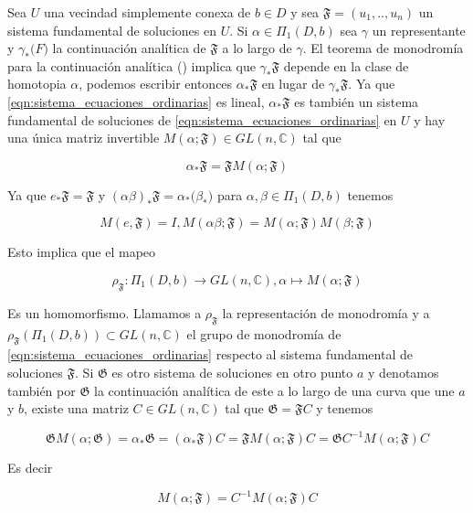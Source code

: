 Sea $U$ una vecindad simplemente conexa de $b \in D $ y sea $\mathfrak{F}= (u_{1},..,u_{n})$ un sistema fundamental de soluciones en $U$. Si $\alpha \in \Pi_{1}(D,b)$ sea $\gamma$ un representante y $\gamma_{*} \mathfrak(F)$ la continuaci\'on anal\'itica de $\mathfrak{F} $ a lo largo de $\gamma$. El teorema de monodrom\'ia para la continuaci\'on anal\'itica (\cite{gausspainleve}) implica que $\gamma_{*} \mathfrak{F}$ depende en la clase de homotopia $\alpha$, podemos escribir entonces $\alpha_{*} \mathfrak{F}$ en lugar de $\gamma_{*} \mathfrak{F}$. Ya que \ref{eqn:sistema_ecuaciones_ordinarias} es lineal, $\alpha_{*} \mathfrak{F}$ es tambi\'en un sistema fundamental de soluciones de \ref{eqn:sistema_ecuaciones_ordinarias} en $U$ y hay una \'unica matriz invertible $M(\alpha; \mathfrak{F}) \in GL(n,\mathbb{C})$ tal que

\begin{equation} \label{relacionmatrizsisfun}
\alpha_{*} \mathfrak{F} = \mathfrak{F} M(\alpha;\mathfrak{F})
\end{equation}

Ya que $e_{*} \mathfrak{F} = \mathfrak{F}$ y $(\alpha \beta)_{*} \mathfrak{F} = \alpha_{*} (\beta_{*} \mathfrak) $ para $\alpha ,\beta \in \Pi_{1} (D,b) $ tenemos

$$M(e,\mathfrak{F}) = I , M(\alpha \beta ;\mathfrak{F}) = M(\alpha ;\mathfrak{F})M(\beta ;\mathfrak{F}) $$

Esto implica que el mapeo

$$\rho_{\mathfrak{F}}: \Pi_{1} (D,b) \rightarrow GL(n,\mathbb{C}), \alpha \mapsto M(\alpha ; \mathfrak{F}) $$

Es un homomorfismo. Llamamos a $\rho_{\mathfrak{F}}$ la representaci\'on de monodrom\'ia y a $\rho_{\mathfrak{F}}(\Pi_{1} (D,b)) \subset GL(n, \mathbb{C})$ el grupo de monodrom\'ia de \ref{eqn:sistema_ecuaciones_ordinarias} respecto al sistema fundamental de soluciones $\mathfrak{F}$. Si $\mathfrak{G}$ es otro sistema de soluciones en otro punto $a$ y denotamos tambi\'en por $\mathfrak{G}$ la continuaci\'on anal\'itica de este a lo largo de una curva que une $a$ y $b$, existe una matriz $C \in GL(n,\mathbb{C})$ tal que $\mathfrak{G} = \mathfrak{F} C$ y tenemos

$$\mathfrak{G} M(\alpha ; \mathfrak{G})=\alpha_{*} \mathfrak{G} = (\alpha_{*} \mathfrak{F}) C  = \mathfrak{F} M(\alpha ; \mathfrak{F}) C = \mathfrak{G} C^{-1 } M(\alpha ; \mathfrak{F}) C $$

Es decir

$$M(\alpha ; \mathfrak{F}) = C^{-1} M(\alpha ; \mathfrak{F} )C$$


